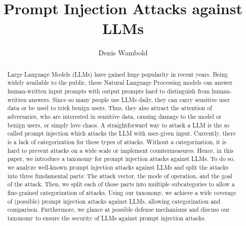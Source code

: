 \documentclass[a4paper,sigconf]{acmart}
\title{Prompt Injection Attacks against LLMs}
\begin{document}
\author{Denis Wambold}

\begin{abstract}
Large Language Models (LLMs) have gained huge popularity in recent years. 
Being widely available to the public, these Natural Language Processing models can answer human-written input prompts with output prompts hard to distinguish from human-written answers.
Since so many people use LLMs daily, they can carry sensitive user data or be used to trick benign users.
Thus, they also attract the attention of adversaries, who are interested in sensitive data, causing damage to the model or benign users, or simply love chaos.
A straightforward way to attack a LLM is the so called prompt injection which attacks the LLM with user-given input. 
Currently, there is a lack of categorization for these types of attacks. 
Without a categorization, it is hard to prevent attacks on a wide scale or implement countermeasures.
Hence, in this paper, we introduce a taxonomy for prompt injection attacks against LLMs.
To do so, we analyze well-known prompt injection attacks against LLMs and split the attacks into three fundamental parts: The attack vector, the mode of operation, and the goal of the attack. 
Then, we split each of those parts into multiple subcategories to allow a fine-grained categorization of attacks. 
Using our taxonomy, we achieve a wide coverage of (possible) prompt injection attacks against LLMs, allowing categorization and comparison.
Furthermore, we glance at possible defense mechanisms and discuss our taxonomy to ensure the security of LLMs against prompt injection attacks.
\end{abstract}
\maketitle








\end{document}
